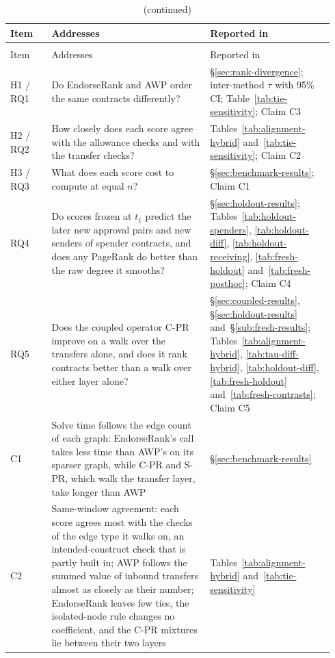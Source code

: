 \begingroup
{}\small\setlength{\tabcolsep}{3.5pt}\captionsetup{font=normalsize}
\begin{longtable}{p{0.12\linewidth}p{0.46\linewidth}p{0.36\linewidth}}
\caption{Summary of hypotheses, research questions, and empirical claims.}
\label{tab:hrq-claim-map}\\
\toprule
Item & Addresses & Reported in \\
\midrule
\endfirsthead
\caption[]{(continued)}\\
\toprule
Item & Addresses & Reported in \\
\midrule
\endhead
\bottomrule
\endlastfoot
H1 / RQ1 & Do EndorseRank and AWP order the same contracts differently? & \S\ref{sec:rank-divergence}; inter-method $\tau$ with 95\% CI; Table~\ref{tab:tie-sensitivity}; Claim C3 \\
H2 / RQ2 & How closely does each score agree with the allowance checks and with the transfer checks? & Tables~\ref{tab:alignment-hybrid} and~\ref{tab:tie-sensitivity}; Claim C2 \\
H3 / RQ3 & What does each score cost to compute at equal $n$? & \S\ref{sec:benchmark-results}; Claim C1 \\
RQ4 & Do scores frozen at $t_1$ predict the later new approval pairs and new senders of spender contracts, and does any PageRank do better than the raw degree it smooths? & \S\ref{sec:holdout-results}; Tables~\ref{tab:holdout-spenders}, \ref{tab:holdout-diff}, \ref{tab:holdout-receiving}, \ref{tab:fresh-holdout} and~\ref{tab:fresh-posthoc}; Claim C4 \\
RQ5 & Does the coupled operator C-PR improve on a walk over the transfers alone, and does it rank contracts better than a walk over either layer alone? & \S\ref{sec:coupled-results}, \S\ref{sec:holdout-results} and~\S\ref{sub:fresh-results}; Tables~\ref{tab:alignment-hybrid}, \ref{tab:tau-diff-hybrid}, \ref{tab:holdout-diff}, \ref{tab:fresh-holdout} and~\ref{tab:fresh-contrasts}; Claim C5 \\
C1 & Solve time follows the edge count of each graph: EndorseRank's call takes less time than AWP's on its sparser graph, while C-PR and S-PR, which walk the transfer layer, take longer than AWP & \S\ref{sec:benchmark-results} \\
C2 & Same-window agreement: each score agrees most with the checks of the edge type it walks on, an intended-construct check that is partly built in; AWP follows the summed value of inbound transfers almost as closely as their number; EndorseRank leaves few ties, the isolated-node rule changes no coefficient, and the C-PR mixtures lie between their two layers &Tables~\ref{tab:alignment-hybrid} and~\ref{tab:tie-sensitivity} \\

\end{longtable}
